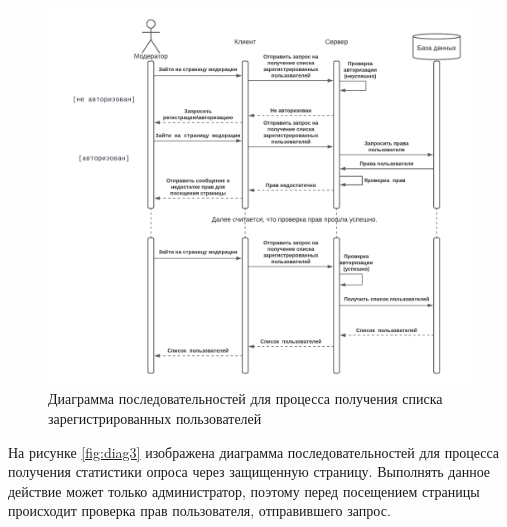 \begin{center}
	\begin{figure}[H]
		\centering
		\includegraphics[width=\linewidth]{assets/diag-2.png}
		\caption{Диаграмма последовательностей для процесса получения списка зарегистрированных пользователей}
		\label{fig:diag2}
	\end{figure}
\end{center}

На рисунке \ref{fig:diag3} изображена диаграмма последовательностей для процесса получения статистики опроса через защищенную страницу. Выполнять данное действие может только администратор, поэтому перед посещением страницы происходит проверка прав пользователя, отправившего запрос. 

